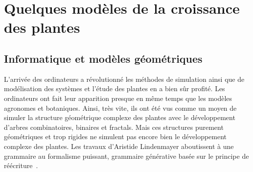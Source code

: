 \section{Quelques modèles de la croissance des plantes}
\label{ann:modele}

\subsection{Informatique et modèles géométriques}

L’arrivée des ordinateurs a révolutionné les méthodes de simulation ainsi que
de modélisation des systèmes et l’étude des plantes en a bien sûr profité.
Les ordinateurs ont fait leur apparition presque en même temps que les
modèles agronomes et botaniques. Ainsi, très vite, ils ont été vus comme un
moyen de simuler la structure géométrique complexe des plantes avec le
développement d’arbres combinatoires, binaires et fractals. 
Mais ces structures purement géométriques et trop rigides ne simulent pas
encore bien le développement complexe des plantes.
Les travaux d’Aristide Lindenmayer aboutissent à une grammaire au formalisme
puissant, grammaire générative basée sur le principe de
réécriture~\cite{LSystem}.

